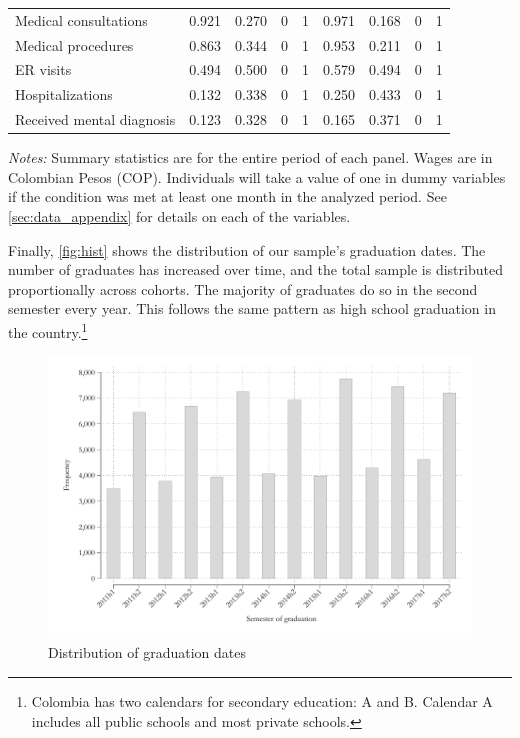 \documentclass[12pt, a4paper]{article}
\begin{document}
\begin{table}[H]
{\begin{threeparttable}
\begin{tabular}{lcccccccc}
    Medical consultations & 0.921 & 0.270 & 0     & 1     & 0.971 & 0.168 & 0     & 1 \\
    Medical procedures & 0.863 & 0.344 & 0     & 1     & 0.953 & 0.211 & 0     & 1 \\
    ER visits & 0.494 & 0.500 & 0     & 1     & 0.579 & 0.494 & 0     & 1 \\
    Hospitalizations & 0.132 & 0.338 & 0     & 1     & 0.250 & 0.433 & 0     & 1 \\
    Received mental diagnosis & 0.123 & 0.328 & 0     & 1     & 0.165 & 0.371 & 0     & 1 \\
    \bottomrule
    \end{tabular}%
  \begin{tablenotes}[flushleft] \footnotesize
\item \textit{Notes:} Summary statistics are for the entire period of each panel. Wages are in Colombian Pesos (COP). Individuals will take a value of one in dummy variables if the condition was met at least one month in the analyzed period. See \autoref{sec:data_appendix} for details on each of the variables. 
\end{tablenotes}
\end{threeparttable}}
  \label{tab:pila_rips_gender}%
\end{table}%

Finally, \autoref{fig:hist} shows the distribution of our sample's graduation dates. The number of graduates has increased over time, and the total sample is distributed proportionally across cohorts. The majority of graduates do so in the second semester every year. This follows the same pattern as high school graduation in the country.\footnote{Colombia has two calendars for secondary education: A and B. Calendar A includes all public schools and most private schools.}

\begin{figure}[H]
\caption{Distribution of graduation dates}\label{fig:hist}
\centering 
\includegraphics[width=\textwidth]{Figures/hist_graduates_sample_half.pdf}
\end{figure}
\end{document}
